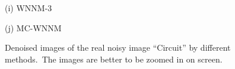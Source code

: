 \documentclass[10pt,onecolumn,letterpaper]{article}
\begin{document}
\begin{figure}[!htbp]
{\begin{minipage}[t]{0.3\textwidth}
{\footnotesize (i) WNNM-3 \cite{wnnm}   }
\end{minipage}
\begin{minipage}[t]{0.3\textwidth}
\centering
{}
{\footnotesize (j) MC-WNNM  }
\end{minipage}
}
\vspace{-1mm}
\caption{Denoised images of the real noisy image ``Circuit'' \cite{ncwebsite} by different methods.\ The images are better to be zoomed in on screen.}
\label{f9}
\end{figure}
\end{document}
